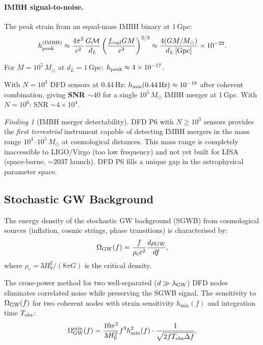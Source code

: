 \documentclass[11pt]{article}
\theoremstyle{definition}
\theoremstyle{remark}
\newtheorem{finding}[theorem]{Finding}
\newcommand{\Msun}{M_\odot}
\newcommand{\ee}[1]{\times10^{#1}}
\begin{document}
\paragraph{IMBH signal-to-noise.}
The peak strain from an equal-mass IMBH binary at 1\,Gpc:
\begin{equation}
h_{\rm peak}^{(\rm IMBH)} \approx \frac{4\pi^2}{c^2} \frac{G\mathcal{M}}{d_L}
\left(\frac{f_{\rm coal} G M}{c^3}\right)^{2/3}
\approx \frac{4(GM/\Msun)}{d_L\,[{\rm Gpc}]} \times 10^{-22}.
\end{equation}

For $M = 10^5\,\Msun$ at $d_L = 1$\,Gpc: $h_{\rm peak} \approx 4\ee{-17}$.

With $N=10^3$ DFD sensors at 0.44\,Hz: $h_{\min}(0.44\,\rm Hz) \approx 10^{-18}$
after coherent combination, giving \textbf{SNR $\sim 40$} for a single
$10^5\,\Msun$ IMBH merger at 1\,Gpc.  With $N=10^6$: SNR $\sim 4\ee{4}$.

\begin{finding}[IMBH merger detectability]
DFD P6 with $N \geq 10^3$ sensors provides the \emph{first terrestrial}
instrument capable of detecting IMBH mergers in the mass range
$10^4$--$10^5\,\Msun$ at cosmological distances.  This mass range is
completely inaccessible to LIGO/Virgo (too low frequency) and not yet
built for LISA (space-borne, $\sim$2037 launch).  DFD P6 fills a unique
gap in the astrophysical parameter space.
\end{finding}

\subsection{Stochastic GW Background}

The energy density of the stochastic GW background (SGWB) from
cosmological sources (inflation, cosmic strings, phase transitions) is
characterised by:
\begin{equation}
\Omega_{\rm GW}(f) = \frac{f}{\rho_c c^2} \frac{d\rho_{\rm GW}}{df},
\end{equation}
where $\rho_c = 3H_0^2/(8\pi G)$ is the critical density.

The cross-power method for two well-separated ($d \gg \lambda_{\rm GW}$)
DFD nodes eliminates correlated noise while preserving the SGWB signal.
The sensitivity to $\Omega_{\rm GW}(f)$ for two coherent nodes with
strain sensitivity $h_{\min}(f)$ and integration time $T_{\rm obs}$:
\begin{equation}
\Omega_{\rm GW}^{\min}(f) = \frac{10\pi^2}{3 H_0^2} f^3 h_{\min}^2(f)
\cdot \frac{1}{\sqrt{2 f T_{\rm obs} \Delta f}}.
\label{eq:Omega-min}
\end{equation}
\end{document}
